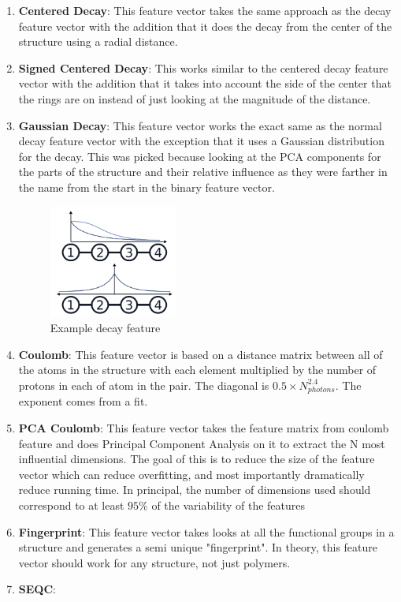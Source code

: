 \documentclass[12pt, oneside]{article}   	%
\begin{document}
\begin{enumerate}
\item \textbf{Centered Decay}: This feature vector takes the same approach as the decay feature vector with the addition that it does the decay from the center of the structure using a radial distance.

\item \textbf{Signed Centered Decay}: This works similar to the centered decay feature vector with the addition that it takes into account the side of the center that the rings are on instead of just looking at the magnitude of the distance.

\item \textbf{Gaussian Decay}: This feature vector works the exact same as the normal decay feature vector with the exception that it uses a Gaussian distribution for the decay. This was picked because looking at the PCA components for the parts of the structure and their relative influence as they were farther in the name from the start in the binary feature vector.

\begin{figure}[H]
\begin{center}
\includegraphics [width=0.4\textwidth]{decay.png}
\caption{Example decay feature}\label{decay}
\end{center}
\end{figure}

\item \textbf{Coulomb}: This feature vector is based on a distance matrix between all of the atoms in the structure with each element multiplied by the number of protons in each of atom in the pair. The diagonal is $0.5 \times N_{photons}^{2.4}$. The exponent comes from a fit.

\item \textbf{PCA Coulomb}: This feature vector takes the feature matrix from coulomb feature and does Principal Component Analysis on it to extract the N most influential dimensions. The goal of this is to reduce the size of the feature vector which can reduce overfitting, and most importantly dramatically reduce running time. In principal, the number of dimensions used should correspond to at least $95\% $ of the variability of the features

\item \textbf{Fingerprint}: This feature vector takes looks at all the functional groups in a structure and generates a semi unique "fingerprint". In theory, this feature vector should work for any structure, not just polymers.


\item \textbf{SEQC}: 

\end{enumerate}
\end{document}
